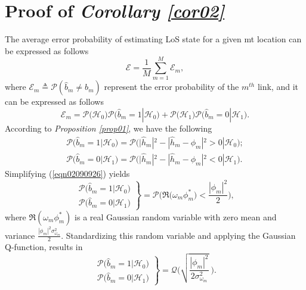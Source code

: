 \documentclass[conference, a4paper]{IEEEtran}
\newcommand{\corref}[1]{{\it Corollary \ref{#1}}}
\renewcommand{\eqref}[1]{(\ref{#1})}
\newcommand{\propref}[1]{{\it Proposition \ref{#1}}}
\begin{document}
\section{Proof of \corref{cor02}} \label{appB}
The average error probability of estimating LoS state for a given \gls{mt} location can be expressed as follows
\begin{equation} \label{eqn09291010}
	\mathscr{E} = \dfrac{1}{M} \sum_{m = 1}^{M} \mathscr{E}_{m},
\end{equation}
where $\mathscr{E}_{m} \triangleq \mathcal{P}(\hat{b}_{m} \neq b_{m})$ represent the error probability of the $m^{th}$ link, and it can be expressed as follows
\begin{equation}\label{eqn03291105}
	\mathscr{E}_{m} = \mathcal{P}\big(\mathcal{H}_{0}\big)\mathcal{P}\big(\hat{b}_{m} = 1 | \mathcal{H}_{0}\big) + \mathcal{P}\big(\mathcal{H}_{1}\big)\mathcal{P}\big(\hat{b}_{m} = 0 | \mathcal{H}_{1}\big).
\end{equation}
According to \propref{prop01}, we have the following
\begin{subequations}\label{eqn02090926}
	\begin{align}
		\mathcal{P}\big(\hat{b}_{m} = 1 | \mathcal{H}_{0}\big) = \mathcal{P}\big(|\hat{h}_{m}|^{2} - |\hat{h}_{m} - \phi_{m}|^{2} > 0 | \mathcal{H}_{0}\big); \label{eqn02090926a} \\
		\mathcal{P}\big(\hat{b}_{m} = 0 | \mathcal{H}_{1}\big) = \mathcal{P}\big(|\hat{h}_{m}|^{2} - |\hat{h}_{m} - \phi_{m}|^{2} < 0 | \mathcal{H}_{1}\big). \label{eqn02090926b}
	\end{align}
\end{subequations}
Simplifying \eqref{eqn02090926} yields
\begin{equation}
	\left.\begin{array}{l}
	\mathcal{P}\big(\hat{b}_{m} = 1 | \mathcal{H}_{0}\big)\\
	\mathcal{P}\big(\hat{b}_{m} = 0 | \mathcal{H}_{1}\big)
	\end{array}\right\}
	=\mathcal{P}\bigg(\Re\big(\omega_{m}\phi_m^{*}\big) < \frac{|\phi_{m}|^{2}}{2}\bigg),
\end{equation}
where $\Re(\omega_{m}\phi_{m}^{*})$ is a real Gaussian random variable with zero mean and variance $\frac{|\phi_{m}|^{2}\sigma_{\omega_{m}}^{2}}{2}$.
Standardizing this random variable and applying the Gaussian Q-function, results in
\begin{equation} \label{eqn06080925}
	\left.\begin{array}{l}
	\mathcal{P}\big(\hat{b}_{m} = 1 | \mathcal{H}_{0}\big)\\
	\mathcal{P}\big(\hat{b}_{m} = 0 | \mathcal{H}_{1}\big)
	\end{array}\right\}
	= \mathcal{Q}\bigg(\sqrt{\frac{|\phi_m|^2}{2\sigma_{\omega_{m}}^{2}}}\ \bigg).
\end{equation}
\end{document}
